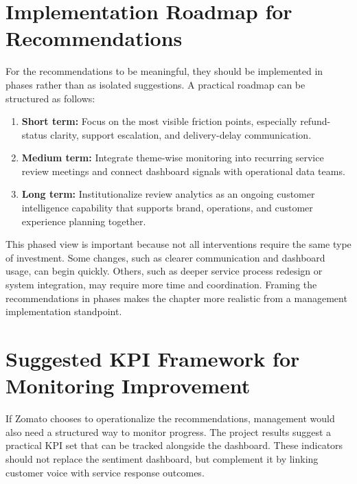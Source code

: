 \section{Implementation Roadmap for Recommendations}

For the recommendations to be meaningful, they should be implemented in phases rather than as isolated suggestions. A practical roadmap can be structured as follows:

\begin{enumerate}[label=\arabic*.]
    \item \textbf{Short term:} Focus on the most visible friction points, especially refund-status clarity, support escalation, and delivery-delay communication.
    \item \textbf{Medium term:} Integrate theme-wise monitoring into recurring service review meetings and connect dashboard signals with operational data teams.
    \item \textbf{Long term:} Institutionalize review analytics as an ongoing customer intelligence capability that supports brand, operations, and customer experience planning together.
\end{enumerate}

This phased view is important because not all interventions require the same type of investment. Some changes, such as clearer communication and dashboard usage, can begin quickly. Others, such as deeper service process redesign or system integration, may require more time and coordination. Framing the recommendations in phases makes the chapter more realistic from a management implementation standpoint.

\section{Suggested KPI Framework for Monitoring Improvement}

If Zomato chooses to operationalize the recommendations, management would also need a structured way to monitor progress. The project results suggest a practical KPI set that can be tracked alongside the dashboard. These indicators should not replace the sentiment dashboard, but complement it by linking customer voice with service response outcomes.


